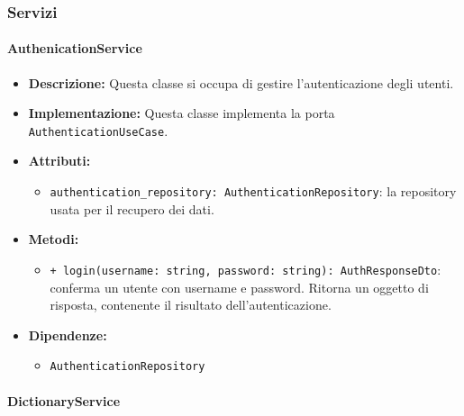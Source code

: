 \subsubsection{Servizi}

\paragraph{AuthenicationService}

\begin{itemize}
    \item \textbf{Descrizione:} Questa classe si occupa di gestire l'autenticazione degli utenti.
    \item \textbf{Implementazione:} Questa classe implementa la porta \texttt{AuthenticationUseCase}.
    \item \textbf{Attributi:}
    \begin{itemize}
        \item \texttt{authentication\_repository: AuthenticationRepository}: la repository usata per il recupero dei dati.
    \end{itemize}
    \item \textbf{Metodi:}
    \begin{itemize}
        \item \texttt{+ login(username: string, password: string): AuthResponseDto}: conferma un utente con username e password. Ritorna un oggetto di risposta, contenente il risultato dell'autenticazione.
    \end{itemize}
    \item \textbf{Dipendenze:}
    \begin{itemize}
        \item \texttt{AuthenticationRepository}
    \end{itemize}
\end{itemize}  

\paragraph{DictionaryService}

